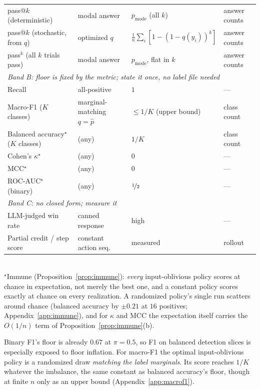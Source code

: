 \documentclass{article}
\theoremstyle{plain}
\theoremstyle{definition}
\begin{document}
\begin{table}[t]
\begin{tabular}{llll}
    pass@$k$ (deterministic) & modal answer & $p_{\mathrm{mode}}$ (all $k$) & answer counts \\
    pass@$k$ (stochastic, from $q$) & optimized $q$ & $\tfrac{1}{n}\sum_i [1-(1-q(y_i))^{k}]$ & answer counts \\
    pass$^{k}$ (all $k$ trials pass) & modal answer & $p_{\mathrm{mode}}$, flat in $k$ & answer counts \\
    \midrule
    \multicolumn{4}{l}{\emph{Band B: floor is fixed by the metric; state it once, no label file needed}} \\
    Recall & all-positive & $1$ & --- \\
    Macro-F1 ($K$ classes) & marginal-matching $q = \hat{p}$ & $\le 1/K$ (upper bound) & class count \\
    Balanced accuracy$^\star$ ($K$ classes) & (any) & $1/K$ & class count \\
    Cohen's $\kappa^\star$ & (any) & $0$ & --- \\
    MCC$^\star$ & (any) & $0$ & --- \\
    ROC-AUC$^\star$ (binary) & (any) & $\nicefrac{1}{2}$ & --- \\
    \midrule
    \multicolumn{4}{l}{\emph{Band C: no closed form; measure it}} \\
    LLM-judged win rate & canned response & high \citep{zheng2024cheating} & --- \\
    Partial credit / step score & constant action seq. & measured & rollout \\
    \bottomrule
  \end{tabular}
  \\[2pt]
  {\footnotesize $^\star$Immune (Proposition~\ref{prop:immune}): \emph{every} input-oblivious policy scores at chance in expectation, not merely the best one, and a constant policy scores exactly at chance on every realization. A randomized policy's single run scatters around chance (balanced accuracy by $\pm 0.21$ at $16$ positives; Appendix~\ref{app:immune}), and for $\kappa$ and MCC the expectation itself carries the $O(1/n)$ term of Proposition~\ref{prop:immune}(b).}
\end{table}

Binary F1's floor is already $0.67$ at $\pi = 0.5$, so F1 on balanced detection slices is especially exposed to floor inflation. For macro-F1 the optimal input-oblivious policy is a randomized draw \emph{matching the label marginals}. Its score reaches $1/K$ whatever the imbalance, the same constant as balanced accuracy's floor, though at finite $n$ only as an upper bound (Appendix~\ref{app:macrof1}).
\end{document}
